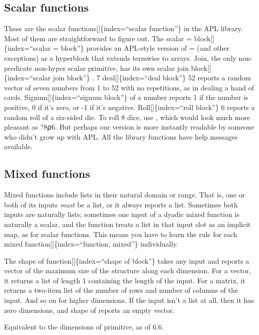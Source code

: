\documentclass[
  letterpaper,
]{book}
\begin{document}
\subsection{Scalar functions}\label{scalar-functions}

These are the scalar functions{[}{]}\{index=``scalar function''\} in the
APL library. Most of them are straightforward to figure out. The scalar
= block{[}{]}\{index=``scalar = block''\} provides an APL-style version
of = (and other exceptions) as a hyperblock that extends termwise to
arrays. Join, the only non-predicate non-hyper scalar primitive, has its
own scalar join block{[}{]}\{index=``scalar join block''\} . 7
deal{[}{]}\{index=``deal block''\} 52 reports a random vector of seven
numbers from 1 to 52 with no repetitions, as in dealing a hand of cards.
Signum{[}{]}\{index=``signum block''\} of a number reports 1 if the
number is positive, 0 if it's zero, or -1 if it's negative.
Roll{[}{]}\{index=``roll block''\} 6 reports a random roll of a
six-sided die. To roll 8 dice, use , which would look much more pleasant
as ?8⍴6. But perhaps our version is more instantly readable by someone
who didn't grow up with APL. All the library functions have help
messages available.

\subsection{Mixed functions}\label{mixed-functions}

Mixed functions include lists in their natural domain or range. That is,
one or both of its inputs \emph{must} be a list, or it always reports a
list. Sometimes both inputs are naturally lists; sometimes one input of
a dyadic mixed function is naturally a scalar, and the function treats a
list in that input slot as an implicit map, as for scalar functions.
This means you have to learn the rule for each mixed
function{[}{]}\{index=``function, mixed''\} individually.

The shape of function{[}{]}\{index=``shape of block''\} takes any input
and reports a vector of the maximum size of the structure along each
dimension. For a vector, it returns a list of length 1 containing the
length of the input. For a matrix, it returns a two-item list of the
number of rows and number of columns of the input. And so on for higher
dimensions. If the input isn't a list at all, then it has zero
dimensions, and shape of reports an empty vector.

Equivalent to the dimensions of primitive, as of 6.6.
\end{document}
